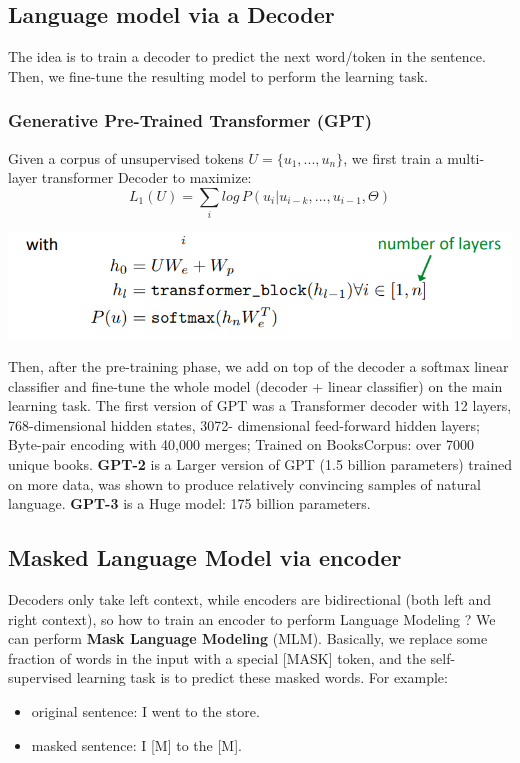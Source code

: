 \subsection{Language model via a Decoder}
The idea is to train a decoder to predict the next word/token in the sentence. Then, we fine-tune the resulting model to perform the learning task.

\subsubsection{Generative Pre-Trained Transformer (GPT)}
Given a corpus of unsupervised tokens $U = \{u_1,..., u_n\}$, we first train a multi-layer transformer Decoder to maximize:
\[L_1(U) = \sum_i log\,P(u_i | u_{i-k}, ..., u_{i - 1}, \Theta)\]
\begin{center}
    \includegraphics[scale=0.6]{images/GPT.png}
\end{center}
Then, after the pre-training phase, we add on top of the decoder a softmax linear classifier and fine-tune the whole model (decoder + linear classifier) on the main learning task.\newline\newline
The first version of GPT was a Transformer decoder with 12 layers, 768-dimensional hidden states, 3072-
dimensional feed-forward hidden layers; Byte-pair encoding with 40,000 merges; Trained on BooksCorpus: over 7000 unique books.\newline\newline
\textbf{GPT-2} is a Larger version of GPT (1.5 billion parameters) trained on more data, was shown to produce relatively convincing samples of natural language.\newline\newline
\textbf{GPT-3} is a Huge model: 175 billion parameters.

\subsection{Masked Language Model via encoder}
Decoders only take left context, while encoders are bidirectional (both left and right context), so how to train an encoder to perform Language Modeling ? We can perform \textbf{Mask Language Modeling} (MLM). Basically, we replace some fraction of words in the input with a special [MASK] token, and the self-supervised learning task is to predict these masked words.\newline\newline
For example:
\begin{itemize}
    \item original sentence: I went to the store.

    \item masked sentence: I [M] to the [M].
\end{itemize}

